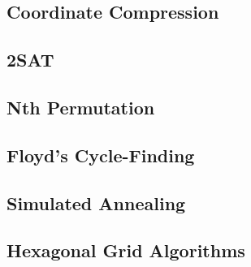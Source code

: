 \documentclass[8pt,a4paper,landscape,oneside]{amsart}
\begin{document}
\begin{multicols*}{3}
	\subsection{Coordinate Compression}
	\subsection{2SAT}
	\subsection{Nth Permutation}
	\subsection{Floyd's Cycle-Finding}
	\subsection{Simulated Annealing}
	\subsection{Hexagonal Grid Algorithms}

\clearpage



\end{multicols*}
\end{document}
